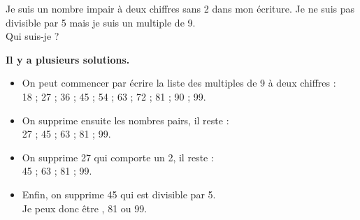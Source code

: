 \begin{exercice*}
    Je suis un nombre impair à deux chiffres sans 2 dans mon écriture. Je ne suis pas divisible par 5 mais je suis un multiple de 9. \\
    Qui suis-je ? 

    \textbf{Il y a plusieurs solutions.}
\end{exercice*}

\begin{corrige}
\begin{itemize}
    \item On peut commencer par écrire la liste des multiples de 9 à deux chiffres : \\
        18 ; 27 ; 36 ; 45 ; 54 ; 63 ; 72 ; 81 ; 90 ; 99.
    \item On supprime ensuite les nombres pairs, il reste : \\
        27 ; 45 ; 63 ; 81 ; 99.
    \item On supprime 27 qui comporte un 2, il reste : \\
        45 ; 63 ; 81 ; 99. \\
    \item Enfin, on supprime 45 qui est divisible par 5. \\
        Je peux donc être {, 81 ou 99}.
\end{itemize}
\end{corrige}
